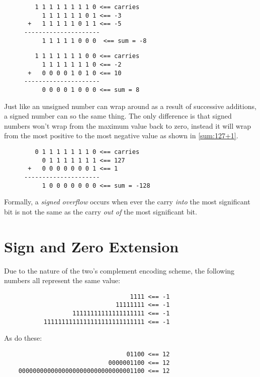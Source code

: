 \begin{figure}[H]
\centering
\begin{BVerbatim}
   1 1 1 1 1 1 1 1 0 <== carries
     1 1 1 1 1 1 0 1 <== -3
 +   1 1 1 1 1 0 1 1 <== -5
---------------------
     1 1 1 1 1 0 0 0  <== sum = -8
\end{BVerbatim}
\label{sum:-3+-5}
\end{figure}

\begin{figure}[H]
\centering
\begin{BVerbatim}
   1 1 1 1 1 1 1 0 0 <== carries
     1 1 1 1 1 1 1 0 <== -2
 +   0 0 0 0 1 0 1 0 <== 10
---------------------
     0 0 0 0 1 0 0 0 <== sum = 8
\end{BVerbatim}
\label{sum:-2+10}
\end{figure}

Just like an unsigned number can wrap around as a result of
successive additions, a signed number can so the same thing.  The
only difference is that signed numbers won't wrap from the maximum 
value back to zero, instead it will wrap from the most positive to 
the most negative value as shown in \autoref{sum:127+1}.
 
\begin{figure}[H]
\centering
\begin{BVerbatim}
   0 1 1 1 1 1 1 1 0 <== carries
     0 1 1 1 1 1 1 1 <== 127
 +   0 0 0 0 0 0 0 1 <== 1
---------------------
     1 0 0 0 0 0 0 0 <== sum = -128
\end{BVerbatim}
\label{sum:127+1}
\end{figure}

\begin{tcolorbox}
Formally, a {\em signed overflow} occurs when ever the carry
{\em into} the most significant bit is not the same as the 
carry {\em out of} the most significant bit.  
\end{tcolorbox}

\section{Sign and Zero Extension}

\label{SignExtension}
Due to the nature of the two's complement encoding scheme, the following 
numbers all represent the same value:
\begin{verbatim}
                                   1111 <== -1
                               11111111 <== -1
                   11111111111111111111 <== -1
           1111111111111111111111111111 <== -1
\end{verbatim}
As do these:
\begin{verbatim}
                                  01100 <== 12
                             0000001100 <== 12
    00000000000000000000000000000001100 <== 12
\end{verbatim}

